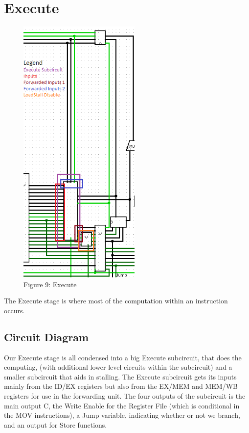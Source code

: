 \documentclass{article}
\begin{document}
\section{Execute}
\begin{figure}
\vspace{-2.1cm}
\begin{center}
\includegraphics[width=6cm]{ALU.png} \\
Figure 9: Execute
\end{center}
\vspace{-2.5cm}
\end{figure}
The Execute stage is where most of the computation within an instruction occurs.
\subsection{Circuit Diagram}

Our Execute stage is all condensed into a big Execute subcircuit, that does the computing, (with additional lower level circuits within the subcircuit) and a smaller subcircuit that aids in stalling. The Execute subcircuit gets its inputs mainly from the ID/EX registers but also from the EX/MEM and MEM/WB registers for use in the forwarding unit. The four outputs of the subcircuit is the main output C, the Write Enable for the Register File (which is conditional in the MOV instructions), a Jump variable, indicating whether or not we branch, and an output for Store functions. 
\end{document}
